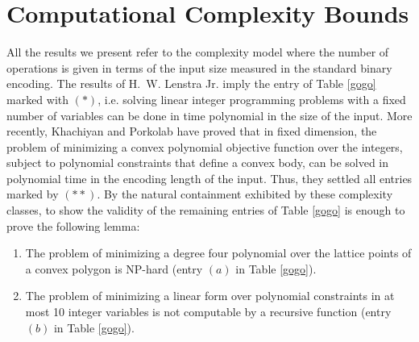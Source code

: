 \documentclass[twoside]{article}
\newcommand{\1}{{\bf 1}}
\begin{document}
\section{Computational Complexity Bounds} \label{bounds}

All the results we present refer to the complexity model where the
number of operations is given in terms of the input size measured in
the standard binary encoding.  The results of H.~W. Lenstra Jr.
\cite{lenstra} imply the entry of Table \ref{gogo} marked with $(*)$,
i.e. solving linear integer programming problems with a fixed number
of variables can be done in time polynomial in the size of the input.
More recently, Khachiyan and Porkolab \cite{khachiyanporkolab} have
proved that in fixed dimension, the problem of minimizing a convex
polynomial objective function over the integers, subject to polynomial
constraints that define a convex body, can be solved in polynomial
time in the encoding length of the input.  Thus, they settled all
entries marked by $(**)$. By the natural containment exhibited by
these complexity classes, to show the validity of the remaining
entries of Table \ref{gogo} is enough to prove the following lemma:

\begin{lemma} 
\begin{enumerate}
\item The problem of minimizing a degree four polynomial over the lattice
  points of a convex polygon is NP-hard (entry $(a)$ in Table \ref{gogo}).

\item The problem of minimizing a linear form over polynomial
  constraints in at most 10 integer variables is not computable by a
  recursive function (entry $(b)$ in Table \ref{gogo}).
\end{enumerate}
\end{lemma}
\end{document}

